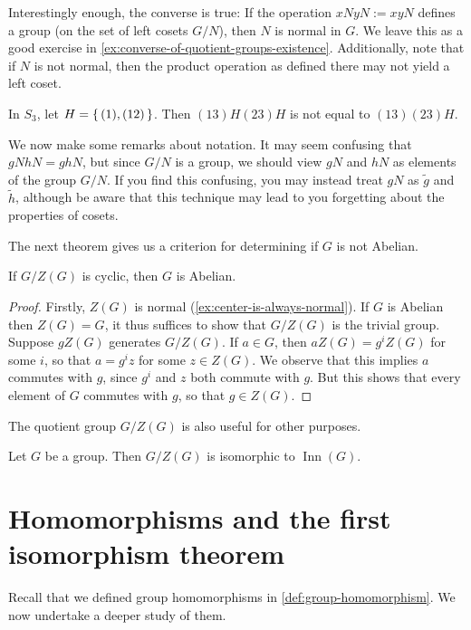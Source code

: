 \documentclass[./main.tex]{subfiles}
\begin{document}
Interestingly enough, the converse is true: If the operation $xN yN := xyN$
defines a group (on the set of left cosets $G/N$), then $N$ is normal in $G$. We
leave this as a good exercise in \cref{ex:converse-of-quotient-groups-existence}.
Additionally, note that if $N$ is not normal, then the product operation as
defined there may not yield a left coset. 

\begin{example}
    In $S_3$, let $H = \set{(1), (12)}$. Then $(13) H (23) H$ is not equal to
    $(13)(23)H$.
\end{example}

We now make some remarks about notation. It may seem confusing that $gN hN =
ghN$, but since $G/N$ is a group, we should view $gN$ and $hN$ as elements of
the group $G/N$. If you find this confusing, you may instead treat $gN$ as
$\tilde g$ and $\tilde h$, although be aware that this technique may lead to you
forgetting about the properties of cosets.

The next theorem gives us a criterion for determining if $G$ is not Abelian. 
\begin{theorem}
\label{thm:g-z-theorem}
    If $G/Z(G)$ is cyclic, then $G$ is Abelian.
\end{theorem}
\begin{proof}
    Firstly, $Z(G)$ is normal (\cref{ex:center-is-always-normal}). If $G$ is
    Abelian then $Z(G) = G$, it thus suffices to show that $G/Z(G)$ is the
    trivial group. Suppose $gZ(G)$ generates $G/Z(G)$. If $a \in G$, then $aZ(G)
    = g^i Z(G)$ for some $i$, so that $a = g^i z$ for some $z \in Z(G)$. We
    observe that this implies $a$ commutes with $g$, since $g^i$ and $z$ both
    commute with $g$. But this shows that every element of $G$ commutes with
    $g$, so that $g \in Z(G)$. 
\end{proof}


The quotient group $G/Z(G)$ is also useful for other purposes. 
\begin{proposition}
\label{prop:structure-of-g-zg}
Let $G$ be a group. Then $G/Z(G)$ is isomorphic to $\operatorname{Inn}(G)$.
\end{proposition}


\section{Homomorphisms and the first isomorphism theorem}
Recall that we defined group homomorphisms in \cref{def:group-homomorphism}. We
now undertake a deeper study of them. 
\end{document}
